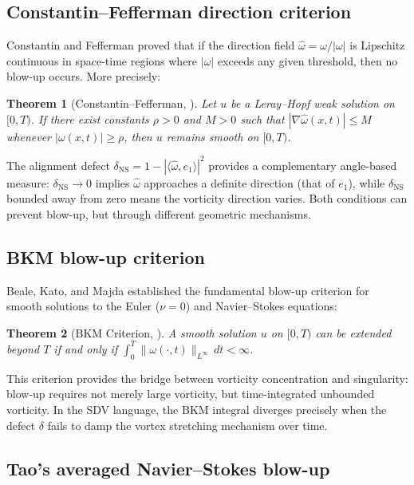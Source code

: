 \documentclass[11pt]{article}
\newtheorem{theorem}{Theorem}[section]
\theoremstyle{definition}
\theoremstyle{remark}
\begin{document}
\subsection{Constantin--Fefferman direction criterion}

Constantin and Fefferman \cite{CF} proved that if the direction field
$\hat\omega = \omega/|\omega|$ is Lipschitz continuous in space-time regions
where $|\omega|$ exceeds any given threshold, then no blow-up occurs.  More
precisely:

\begin{theorem}[Constantin--Fefferman, {\cite{CF}}]
\label{thm:CF}
Let $u$ be a Leray--Hopf weak solution on $[0,T)$.  If there exist constants
$\rho > 0$ and $M > 0$ such that $|\nabla\hat\omega(x,t)| \leq M$ whenever
$|\omega(x,t)| \geq \rho$, then $u$ remains smooth on $[0,T)$.
\end{theorem}

The alignment defect $\delta_{\mathrm{NS}} = 1 - |\langle\hat\omega, e_1\rangle|^2$
provides a complementary angle-based measure: $\delta_{\mathrm{NS}} \to 0$ implies
$\hat\omega$ approaches a definite direction (that of $e_1$), while
$\delta_{\mathrm{NS}}$ bounded away from zero means the vorticity direction varies.
Both conditions can prevent blow-up, but through different geometric mechanisms.

\subsection{BKM blow-up criterion}

Beale, Kato, and Majda \cite{BKM} established the fundamental blow-up criterion
for smooth solutions to the Euler ($\nu = 0$) and Navier--Stokes equations:

\begin{theorem}[BKM Criterion, {\cite{BKM}}]
\label{thm:BKM}
A smooth solution $u$ on $[0,T)$ can be extended beyond $T$ if and only if
$\int_0^T \|\omega(\cdot,t)\|_{L^\infty}\, dt < \infty$.
\end{theorem}

This criterion provides the bridge between vorticity concentration and singularity:
blow-up requires not merely large vorticity, but time-integrated unbounded vorticity.
In the SDV language, the BKM integral diverges precisely when the defect $\delta$
fails to damp the vortex stretching mechanism over time.

\subsection{Tao's averaged Navier--Stokes blow-up}
\end{document}
